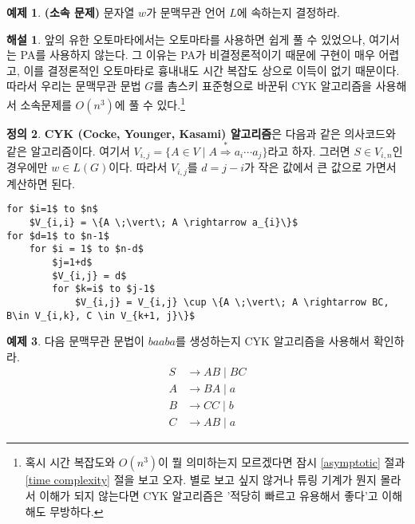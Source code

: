 \documentclass[b5paper, 11pt]{book}
\theoremstyle{definition}
\newtheorem{defn}{정의}[chapter]
\newtheorem{ex}[defn]{예제}
\newtheorem*{ans*}{해설}
\begin{document}
\begin{ex}
    \textbf{(소속 문제)} 문자열 $w$가 문맥무관 언어 $L$에 속하는지 결정하라.     
\end{ex}
\begin{ans*}
    앞의 유한 오토마타에서는 오토마타를 사용하면 쉽게 풀 수 있었으나, 여기서는 PA를 사용하지 않는다. 그 이유는 PA가 비결정론적이기 때문에 구현이 매우 어렵고, 이를 결정론적인 오토마타로 흉내내도 시간 복잡도 상으로 이득이 없기 때문이다.  \\
따라서 우리는 문맥무관 문법 $G$를 촘스키 표준형으로 바꾼뒤 CYK 알고리즘을 사용해서 소속문제를 $O(n^3)$에 풀 수 있다.\footnote{혹시 시간 복잡도와 $O(n^3)$이 뭘 의미하는지 모르겠다면 잠시 \ref{asymptotic} 절과 \ref{time complexity} 절을 보고 오자. 별로 보고 싶지 않거나 튜링 기계가 뭔지 몰라서 이해가 되지 않는다면 CYK 알고리즘은 '적당히 빠르고 유용해서 좋다'고 이해해도 무방하다.} 
\end{ans*}
\begin{defn}\label{CYK}
    \textbf{CYK (Cocke, Younger, Kasami) 알고리즘}은 다음과 같은 의사코드와 같은 알고리즘이다. 여기서 $V_{i,j} = \{A \in V \;\vert\; A \overset{*}{\Rightarrow} a_i \cdots a_j\}$라고 하자. 그러면 $S \in V_{i,n}$인 경우에만 $w\in L(G)$이다. 따라서 $V_{i,j}$를 $d=j-i$가 작은 값에서 큰 값으로 가면서 계산하면 된다. 
    \begin{lstlisting}
for $i=1$ to $n$
    $V_{i,i} = \{A \;\vert\; A \rightarrow a_{i}\}$
for $d=1$ to $n-1$
    for $i = 1$ to $n-d$
        $j=1+d$
        $V_{i,j} = d$
        for $k=i$ to $j-1$
            $V_{i,j} = V_{i,j} \cup \{A \;\vert\; A \rightarrow BC, B\in V_{i,k}, C \in V_{k+1, j}\}$
    \end{lstlisting}
\end{defn}
\begin{ex}
    다음 문맥무관 문법이 $baaba$를 생성하는지 CYK 알고리즘을 사용해서 확인하라.
    \begin{align*}
        S &\rightarrow AB \;\vert\; BC \\ 
        A &\rightarrow BA \;\vert\; a \\ 
        B &\rightarrow CC \;\vert\; b \\ 
        C &\rightarrow AB \;\vert\; a
    \end{align*}
\end{ex}
\end{document}
